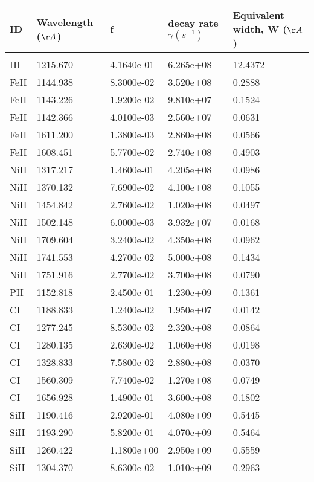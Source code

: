 \documentclass[12pt]{article}
\begin{document}
\begin{table}[H]
	\label{table:W}
	\begin{tabular}{l|l|l|l|l}
		ID  &  Wavelength ($\AA$)& f & decay rate $\gamma (s^{-1})$ & Equivalent width, W ($\AA$)\\
		\hline &&&&\\
		HI    & 1215.670 & 4.1640e-01 & 6.265e+08 & 12.4372 \\
		FeII  & 1144.938 & 8.3000e-02 & 3.520e+08 & 0.2888  \\
		FeII  & 1143.226 & 1.9200e-02 & 9.810e+07 & 0.1524  \\
		FeII  & 1142.366 & 4.0100e-03 & 2.560e+07 & 0.0631  \\
		FeII  & 1611.200 & 1.3800e-03 & 2.860e+08 & 0.0566  \\
		FeII  & 1608.451 & 5.7700e-02 & 2.740e+08 & 0.4903  \\
		NiII  & 1317.217 & 1.4600e-01 & 4.205e+08 & 0.0986  \\
		NiII  & 1370.132 & 7.6900e-02 & 4.100e+08 & 0.1055  \\
		NiII  & 1454.842 & 2.7600e-02 & 1.020e+08 & 0.0497  \\
		NiII  & 1502.148 & 6.0000e-03 & 3.932e+07 & 0.0168  \\
		NiII  & 1709.604 & 3.2400e-02 & 4.350e+08 & 0.0962  \\
		NiII  & 1741.553 & 4.2700e-02 & 5.000e+08 & 0.1434  \\
		NiII  & 1751.916 & 2.7700e-02 & 3.700e+08 & 0.0790  \\
		PII   & 1152.818 & 2.4500e-01 & 1.230e+09 & 0.1361  \\
		CI    & 1188.833 & 1.2400e-02 & 1.950e+07 & 0.0142  \\
		CI    & 1277.245 & 8.5300e-02 & 2.320e+08 & 0.0864  \\
		CI    & 1280.135 & 2.6300e-02 & 1.060e+08 & 0.0198  \\
		CI    & 1328.833 & 7.5800e-02 & 2.880e+08 & 0.0370  \\
		CI    & 1560.309 & 7.7400e-02 & 1.270e+08 & 0.0749  \\
		CI    & 1656.928 & 1.4900e-01 & 3.600e+08 & 0.1802  \\
		SiII  & 1190.416 & 2.9200e-01 & 4.080e+09 & 0.5445  \\
		SiII  & 1193.290 & 5.8200e-01 & 4.070e+09 & 0.5464  \\
		SiII  & 1260.422 & 1.1800e+00 & 2.950e+09 & 0.5559  \\
		SiII  & 1304.370 & 8.6300e-02 & 1.010e+09 & 0.2963  \\

\end{tabular}
\end{table}
\end{document}
